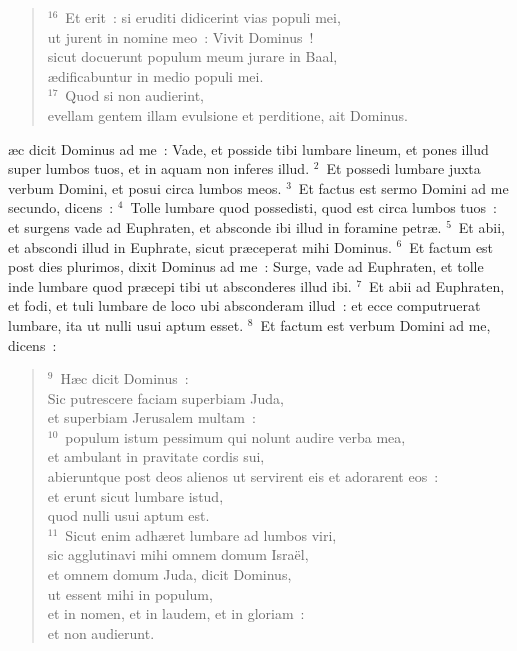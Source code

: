 \begin{flushleft}
\begin{verse}
${}^{16}$~Et erit~: si eruditi didicerint vias populi mei,\\ ut jurent in nomine meo~: Vivit Dominus~!\\ sicut docuerunt populum meum jurare in Baal,\\ \ae dificabuntur in medio populi mei.\\
${}^{17}$~Quod si non audierint,\\ evellam gentem illam evulsione et perditione, ait Dominus.\end{verse}\end{flushleft}



\bchapter
{}\ae c dicit Dominus ad me~: Vade, et posside tibi lumbare lineum, et pones illud super lumbos tuos, et in aquam non inferes illud.
${}^{2}$~Et possedi lumbare juxta verbum Domini, et posui circa lumbos meos.
${}^{3}$~Et factus est sermo Domini ad me secundo, dicens~:
${}^{4}$~Tolle lumbare quod possedisti, quod est circa lumbos tuos~: et surgens vade ad Euphraten, et absconde ibi illud in foramine petr\ae .
${}^{5}$~Et abii, et abscondi illud in Euphrate, sicut pr\ae ceperat mihi Dominus.
${}^{6}$~Et factum est post dies plurimos, dixit Dominus ad me~: Surge, vade ad Euphraten, et tolle inde lumbare quod pr\ae cepi tibi ut absconderes illud ibi.
${}^{7}$~Et abii ad Euphraten, et fodi, et tuli lumbare de loco ubi absconderam illud~: et ecce computruerat lumbare, ita ut nulli usui aptum esset.
${}^{8}$~Et factum est verbum Domini ad me, dicens~:
\begin{flushleft}\begin{verse}${}^{9}$~H\ae c dicit Dominus~:\\ Sic putrescere faciam superbiam Juda,\\ et superbiam Jerusalem multam~:\\
${}^{10}$~populum istum pessimum qui nolunt audire verba mea,\\ et ambulant in pravitate cordis sui,\\ abieruntque post deos alienos ut servirent eis et adorarent eos~:\\ et erunt sicut lumbare istud,\\ quod nulli usui aptum est.\\
${}^{11}$~Sicut enim adh\ae ret lumbare ad lumbos viri,\\ sic agglutinavi mihi omnem domum Isra\"el,\\ et omnem domum Juda, dicit Dominus,\\ ut essent mihi in populum,\\ et in nomen, et in laudem, et in gloriam~:\\ et non audierunt.\end{verse}\end{flushleft}


